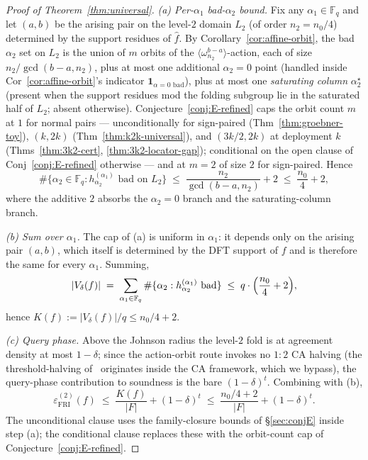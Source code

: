 \documentclass[11pt]{article}
\theoremstyle{definition}
\theoremstyle{remark}
\newcommand{\FF}{\mathbb{F}}
\begin{document}
\begin{proof}[Proof of Theorem~\ref{thm:universal}]

\noindent\textit{(a) Per-$\alpha_1$ bad-$\alpha_2$ bound.}
Fix any $\alpha_1 \in \FF_q$ and let $(a, b)$ be the arising pair on the
level-$2$ domain $L_2$ (of order $n_2 = n_0/4$) determined by the support
residues of $\hat f$. By Corollary~\ref{cor:affine-orbit}, the bad
$\alpha_2$ set on $L_2$ is the union of $m$ orbits of the
$\langle\omega^{b-a}_{n_2}\rangle$-action, each of size
$n_2/\gcd(b{-}a, n_2)$, plus at most one additional $\alpha_2 = 0$ point
(handled inside Cor~\ref{cor:affine-orbit}'s indicator
$\mathbf{1}_{\alpha = 0 \text{ bad}}$), plus at most one
\emph{saturating column} $\alpha_2^\star$ (present when the support
residues mod the folding subgroup lie in the saturated half of
$L_2$; absent otherwise). Conjecture~\ref{conj:E-refined} caps the orbit
count $m$ at $1$ for normal pairs --- unconditionally for sign-paired
(Thm~\ref{thm:groebner-toy}), $(k,2k)$
(Thm~\ref{thm:k2k-universal}), and $(3k/2, 2k)$ at deployment $k$
(Thms~\ref{thm:3k2-cert}, \ref{thm:3k2-locator-gap}); conditional on the
open clause of Conj~\ref{conj:E-refined} otherwise --- and at $m = 2$ of
size $2$ for sign-paired. Hence
\[
 \#\{\alpha_2 \in \FF_q : h_{\alpha_2}^{(\alpha_1)} \text{ bad on } L_2\}
 \;\leq\; \frac{n_2}{\gcd(b{-}a, n_2)} + 2
 \;\leq\; \frac{n_0}{4} + 2,
\]
where the additive $2$ absorbs the $\alpha_2 = 0$ branch and the
saturating-column branch.

\medskip\noindent\textit{(b) Sum over $\alpha_1$.}
The cap of (a) is uniform in $\alpha_1$: it depends only on the arising
pair $(a, b)$, which itself is determined by the DFT support of
$f$ and is therefore the same for every $\alpha_1$. Summing,
\[
 |V_\delta(f)| \;=\; \sum_{\alpha_1 \in \FF_q} \#\{\alpha_2 : h_{\alpha_2}^{(\alpha_1)} \text{ bad}\}
 \;\leq\; q \cdot \Bigl(\frac{n_0}{4} + 2\Bigr),
\]
hence $K(f) := |V_\delta(f)|/q \leq n_0/4 + 2$.

\medskip\noindent\textit{(c) Query phase.}
Above the Johnson radius the level-$2$ fold is at agreement density
at most $1 - \delta$; since the action-orbit route invokes no $1{:}2$
CA halving (the threshold-halving of~\cite{Paper1} originates inside
the CA framework, which we bypass), the query-phase contribution to
soundness is the bare $(1 - \delta)^t$. Combining with (b),
\[
 \varepsilon_{\mathrm{FRI}}^{(2)}(f) \;\leq\; \frac{K(f)}{|F|} + (1 - \delta)^t
 \;\leq\; \frac{n_0/4 + 2}{|F|} + (1 - \delta)^t.
\]
The unconditional clause uses the family-closure bounds of \S\ref{sec:conjE}
inside step (a); the conditional clause replaces these with the
orbit-count cap of Conjecture~\ref{conj:E-refined}.
\end{proof}
\end{document}
